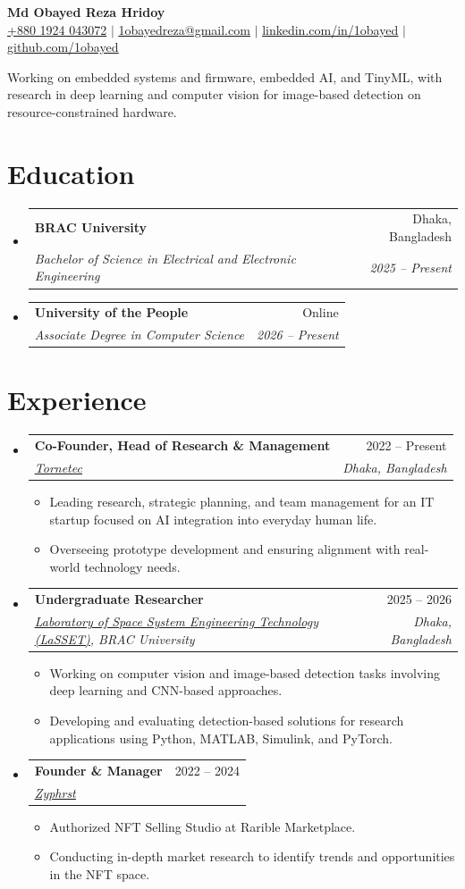 \documentclass[letterpaper,11pt]{article}
\makeatletter
\newcommand{\resumeItem}[1]{\item\small{{#1 \vspace{-2pt}}}}
\newcommand{\resumeSubheading}[4]{
  \vspace{-2pt}\item
    \begin{tabular*}{0.97\textwidth}[t]{l@{\extracolsep{\fill}}r}
      \textbf{#1} & #2 \\
      \textit{\small#3} & \textit{\small #4} \\
    \end{tabular*}\vspace{-7pt}
}
\newcommand{\resumeSubHeadingListStart}{\begin{itemize}[leftmargin=0.15in, label={}]}
\newcommand{\resumeSubHeadingListEnd}{\end{itemize}}
\newcommand{\resumeItemListStart}{\begin{itemize}}
\newcommand{\resumeItemListEnd}{\end{itemize}\vspace{-5pt}}
\makeatother
\begin{document}
\begin{center}
    {\Huge \textbf{Md Obayed Reza Hridoy}} \\ \vspace{9pt}
    \small \href{tel:+8801924043072}{+880 1924 043072} $|$ \href{mailto:1obayedreza@gmail.com}{\underline{1obayedreza@gmail.com}} $|$
    \href{https://linkedin.com/in/1obayed}{\underline{linkedin.com/in/1obayed}} $|$
    \href{https://github.com/1obayed}{\underline{github.com/1obayed}}
\end{center}

\vspace{-10pt}
\begin{center}
\begin{minipage}{0.97\textwidth}
\centering\small Working on embedded systems and firmware, embedded AI, and TinyML, with research in deep learning and computer vision for image-based detection on resource-constrained hardware.
\end{minipage}
\end{center}
\vspace{-12pt}

\section{Education}
  \resumeSubHeadingListStart
    \resumeSubheading{BRAC University}{Dhaka, Bangladesh}{Bachelor of Science in Electrical and Electronic Engineering}{2025 -- Present}
    \resumeSubheading{University of the People}{Online}{Associate Degree in Computer Science}{2026 -- Present}
  \resumeSubHeadingListEnd
  \vspace{-6pt}

\section{Experience}
  \resumeSubHeadingListStart
    \resumeSubheading{Co-Founder, Head of Research \& Management}{2022 -- Present}{\href{https://tornetec.com/}{\underline{Tornetec}}}{Dhaka, Bangladesh}
      \resumeItemListStart
        \resumeItem{Leading research, strategic planning, and team management for an IT startup focused on AI integration into everyday human life.}
        \resumeItem{Overseeing prototype development and ensuring alignment with real-world technology needs.}
      \resumeItemListEnd
    \resumeSubheading{Undergraduate Researcher}{2025 -- 2026}{\href{https://www.facebook.com/braculasset/}{\underline{Laboratory of Space System Engineering Technology (LaSSET)}}, BRAC University}{Dhaka, Bangladesh}
      \resumeItemListStart
        \resumeItem{Working on computer vision and image-based detection tasks involving deep learning and CNN-based approaches.}
        \resumeItem{Developing and evaluating detection-based solutions for research applications using Python, MATLAB, Simulink, and PyTorch.}
      \resumeItemListEnd
    \resumeSubheading{Founder \& Manager}{2022 -- 2024}{\href{https://og.rarible.com/zyphrst}{\underline{Zyphrst}}}{}
      \resumeItemListStart
        \resumeItem{Authorized NFT Selling Studio at Rarible Marketplace.}
        \resumeItem{Conducting in-depth market research to identify trends and opportunities in the NFT space.}
      \resumeItemListEnd
  \resumeSubHeadingListEnd
\end{document}
